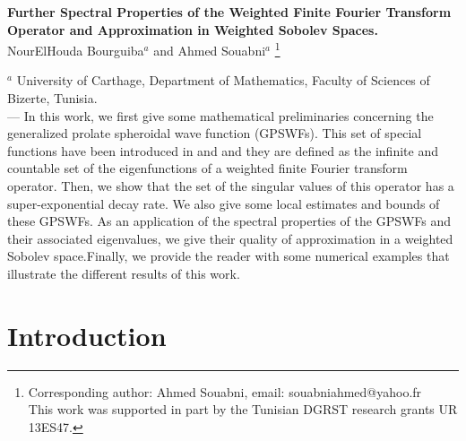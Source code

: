 \documentclass[]{article}
\newcounter{rea}
\begin{document}
\begin{center}
{\large {\bf  Further Spectral Properties of the Weighted Finite Fourier Transform Operator and Approximation in Weighted Sobolev Spaces.}}\\
\vskip 1cm NourElHouda Bourguiba$^a$ and Ahmed Souabni$^a$ {\footnote{
Corresponding author: Ahmed Souabni, email: souabniahmed@yahoo.fr\\
This work was supported in part by the  Tunisian DGRST  research grants  UR 13ES47.}}
\end{center}

\vskip 0.25cm {\small
\noindent
$^a$ University of Carthage, Department of Mathematics, Faculty of Sciences of Bizerte, Tunisia.}\\







---
In this work, we first give some mathematical preliminaries concerning the generalized prolate spheroidal wave function (GPSWFs). This set of special functions have been introduced in \cite{Wang2} and \cite{Karoui-Souabni1} and they are defined as the infinite and countable set of the  eigenfunctions of a weighted finite Fourier transform operator. Then, we show that the set of the singular values of this operator has a super-exponential decay rate. We also give some   local estimates and bounds  of these  GPSWFs. As an application of the spectral properties
of the GPSWFs and their associated eigenvalues, we give their quality of approximation in a weighted Sobolev space.Finally, we provide the reader with some numerical examples that illustrate the different results of this work.\\

\section{Introduction}
\end{document}
